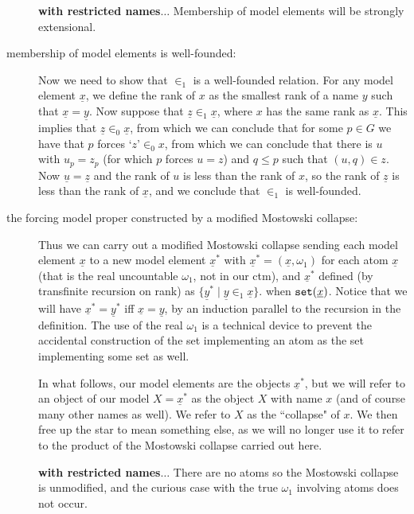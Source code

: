 \documentclass[12pt]{book}
\begin{document}
\begin{description}
{\bf with restricted names$\ldots$}  Membership of model elements will be strongly extensional.

\item[membership of model elements is well-founded:]  Now we need to show that $\in_1$ is a well-founded relation.  For any model element $\underline{x}$, we define the rank of $x$ as the smallest rank of a name $y$ such that
$\underline{x}=\underline{y}$.  Now suppose that $\underline{z} \in_1 \underline{x}$, where $x$ has the same rank as  $\underline{x}$. This implies that  $\underline{z} \in_0 \underline{x}$, from which we can conclude that for some $p \in G$ we have that $p$ forces `$z$'$ \in_0 x$, from which we can conclude that there is $u$ with $u_p=z_p$ (for which $p$ forces $u=z$) and $q \leq p$ such
that $(u,q) \in z$.  Now $\underline{u} = \underline{z}$ and the rank of $u$ is less than the rank of $x$, so the rank of $\underline{z}$ is less than the rank of $\underline{x}$, and we conclude that $\in_1$ is well-founded.

\item[the forcing model proper constructed by a modified Mostowski collapse:]  Thus we can carry out a modified Mostowski collapse sending each model element $\underline{x}$ to a new model element $\underline{x}^*$ with $\underline{x}^* = (\underline{x},\omega_1)$  for each atom  $\underline{x}$ (that is the real uncountable $\omega_1$, not in our ctm), and $\underline{x}^*$ defined (by transfinite recursion on rank) as $\{\underline{y}^* \mid \underline{y} \in_1 \underline{x}\}$. when ${\tt set}(\underline{x})$.  Notice that we will have $\underline{x}^* = \underline{y}^*$ iff $\underline{x} = \underline{y}$, by an induction parallel to the recursion in the definition.  The use of the real $\omega_1$ is a technical device to prevent the accidental construction of the set implementing an atom as the set implementing some set as well.

In what follows, our model elements are the objects $\underline{x}^*$, but we will refer to an object of our model  $X=\underline{x}^*$ as the object $X$ with name $x$ (and of course many other names as well).   We refer to $X$ as the ``collapse" of $x$.  We then free up the star to mean something else, as we will no longer use it to refer to the product of the Mostowski collapse carried out here.

{\bf with restricted names$\ldots$}  There are no atoms so the Mostowski collapse is unmodified, and the curious case with the true $\omega_1$ involving atoms does not occur.

\end{description}
\end{document}
